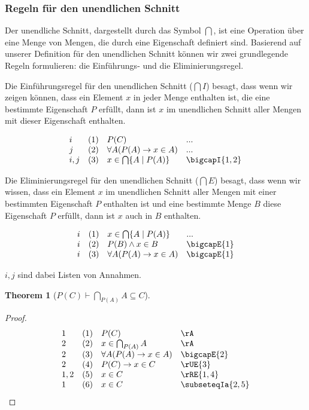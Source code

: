\documentclass{book}
\theoremstyle{plain}
\newtheorem{theorem}{Theorem}
\theoremstyle{remark}
\theoremstyle{definition}
\begin{document}
\subsubsection{Regeln für den unendlichen Schnitt}
\label{rule:bigcapI} \label{rule:bigcapE}

Der unendliche Schnitt, dargestellt durch das Symbol \(\bigcap\), ist eine Operation über eine Menge von Mengen, die durch eine Eigenschaft definiert sind. Basierend auf unserer Definition für den unendlichen Schnitt können wir zwei grundlegende Regeln formulieren: die Einführungs- und die Eliminierungsregel.

Die Einführungsregel für den unendlichen Schnitt (\(\bigcap I\)) besagt, dass wenn wir zeigen können, dass ein Element \(x\) in jeder Menge enthalten ist, die eine bestimmte Eigenschaft \(P\) erfüllt, dann ist \(x\) im unendlichen Schnitt aller Mengen mit dieser Eigenschaft enthalten.

\[
\begin{array}{llll}
	i & (1) & P(C) & ... \\
	j & (2) & \forall A(P(A)\rightarrow x\in A) & ... \\
	i,j & (3) & x\in \bigcap \{ A \mid P(A) \} & \bigcapI{1,2} \\
\end{array}
\]

Die Eliminierungsregel für den unendlichen Schnitt (\( \bigcap E\)) besagt, dass wenn wir wissen, dass ein Element \(x\) im unendlichen Schnitt aller Mengen mit einer bestimmten Eigenschaft \(P\) enthalten ist und eine bestimmte Menge \(B\) diese Eigenschaft \(P\) erfüllt, dann ist \(x\) auch in \(B\) enthalten.

\[
\begin{array}{llll}
	i & (1) & x\in \bigcap \{ A \mid P(A) \} & ... \\
	i & (2) & P(B)\land x\in B & \bigcapE{1} \\
	i & (3) & \forall A(P(A)\rightarrow x\in A) & \bigcapE{1} \\
\end{array}
\]

\(i,j\) sind dabei Listen von Annahmen.


\label{PLpCRpImpBigcapSubLbPLpARpRbASubseteqC}
\begin{theorem}[\(P(C)\vdash \bigcap_{P(A)} A\subseteq C\)]
\end{theorem}

\begin{proof}
	\[
	\begin{array}{llll}
		1 & (1) & P(C) & \rA \\
		2 & (2) & x\in\bigcap_{P(A)} A & \rA \\
		2 & (3) & \forall A(P(A)\rightarrow x\in A) & \bigcapE{2} \\
		2 & (4) & P(C)\rightarrow x\in C & \rUE{3} \\		
		1,2 & (5) & x\in C & \rRE{1,4} \\	
		1 & (6) & x\in C & \subseteqIa{2,5} \\
	\end{array}
	\]
\end{proof}
\end{document}
